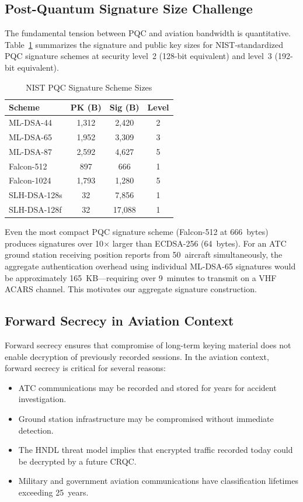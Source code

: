 \documentclass[conference,10pt]{IEEEtran}
\begin{document}
\subsection{Post-Quantum Signature Size Challenge}

The fundamental tension between PQC and aviation bandwidth is quantitative. Table~\ref{tab:pqc_sizes} summarizes the signature and public key sizes for NIST-standardized PQC signature schemes at security level~2 (128-bit equivalent) and level~3 (192-bit equivalent).

\begin{table}[t]
\centering
\caption{NIST PQC Signature Scheme Sizes}
\label{tab:pqc_sizes}
\begin{tabular}{lccc}
\toprule
\textbf{Scheme} & \textbf{PK (B)} & \textbf{Sig (B)} & \textbf{Level} \\
\midrule
ML-DSA-44 & 1,312 & 2,420 & 2 \\
ML-DSA-65 & 1,952 & 3,309 & 3 \\
ML-DSA-87 & 2,592 & 4,627 & 5 \\
Falcon-512 & 897 & 666 & 1 \\
Falcon-1024 & 1,793 & 1,280 & 5 \\
SLH-DSA-128s & 32 & 7,856 & 1 \\
SLH-DSA-128f & 32 & 17,088 & 1 \\
\bottomrule
\end{tabular}
\end{table}

Even the most compact PQC signature scheme (Falcon-512 at 666~bytes) produces signatures over 10$\times$ larger than ECDSA-256 (64~bytes). For an ATC ground station receiving position reports from 50~aircraft simultaneously, the aggregate authentication overhead using individual ML-DSA-65 signatures would be approximately 165~KB---requiring over 9~minutes to transmit on a VHF ACARS channel. This motivates our aggregate signature construction.

\subsection{Forward Secrecy in Aviation Context}

Forward secrecy ensures that compromise of long-term keying material does not enable decryption of previously recorded sessions. In the aviation context, forward secrecy is critical for several reasons:

\begin{itemize}
    \item ATC communications may be recorded and stored for years for accident investigation.
    \item Ground station infrastructure may be compromised without immediate detection.
    \item The HNDL threat model implies that encrypted traffic recorded today could be decrypted by a future CRQC.
    \item Military and government aviation communications have classification lifetimes exceeding 25~years.
\end{itemize}
\end{document}
